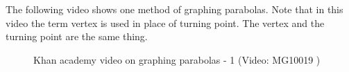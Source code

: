 {\begin{mdframed}[linewidth=4, leftmargin=40, rightmargin=40]
\begin{exercise}
\begin{enumerate}[noitemsep, label=\textbf{Step} \textbf{\arabic*}. ]
\begin{figure}[H]
\begin{center}
      \vspace{2pt}
    \vspace{.1in}
    
    \end{center}

 \end{figure}   

    \addtocounter{footnote}{-0}
    
\end{enumerate}
        


    \end{exercise}
    \end{mdframed}
    }
    \noindent
  
\label{m39345*eip-297}The following video shows one method of graphing parabolas. Note that in this video the term vertex is used in place of turning point. The vertex and the turning point are the same thing.


    \setcounter{subfigure}{0}


	\begin{figure}[H] %
    
    
    \textnormal{Khan academy video on graphing parabolas - 1}\vspace{.1in} \nopagebreak
  \label{m39345*yt-media1}\label{m39345*yt-video1}
             { (Video:  MG10019 )}
      
      \vspace{2pt}
    \vspace{.1in}
    
    

 \end{figure}   

    \addtocounter{footnote}{-0}
    \par \label{m39345*secfhsst!!!underscore!!!id2745}
            \nopagebreak
            
